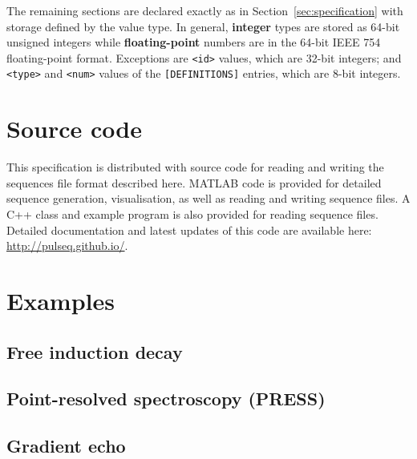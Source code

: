 \documentclass{article}
\begin{document}
The remaining sections are declared exactly as in Section~\ref{sec:specification} with storage defined by the value type. In general, \textbf{integer} types are stored as 64-bit unsigned integers while \textbf{floating-point} numbers are in the 64-bit IEEE 754 floating-point format. Exceptions are \verb.<id>. values, which are 32-bit integers; and \verb.<type>. and \verb.<num>. values of the \verb.[DEFINITIONS]. entries, which are 8-bit integers.

\section{Source code}
This specification is distributed with source code for reading and writing the sequences file format described here. MATLAB code is provided for detailed sequence generation, visualisation, as well as reading and writing sequence files. A C++ class and example program is also provided for reading sequence files. Detailed documentation and latest updates of this code are available here: \url{http://pulseq.github.io/}.

\newpage
\section{Examples}

\subsection{Free induction decay}



\subsection{Point-resolved spectroscopy (PRESS)}



\subsection{Gradient echo}


\end{document}
